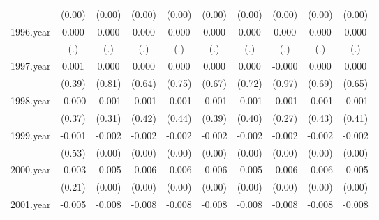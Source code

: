 {\begin{tabular}{l*{9}{c}}
          &   (0.00)         &   (0.00)         &   (0.00)         &   (0.00)         &   (0.00)         &   (0.00)         &   (0.00)         &   (0.00)         &   (0.00)         \\
[1em]
1996.year &    0.000         &    0.000         &    0.000         &    0.000         &    0.000         &    0.000         &    0.000         &    0.000         &    0.000         \\
          &      (.)         &      (.)         &      (.)         &      (.)         &      (.)         &      (.)         &      (.)         &      (.)         &      (.)         \\
[1em]
1997.year &    0.001         &    0.000         &    0.000         &    0.000         &    0.000         &    0.000         &   -0.000         &    0.000         &    0.000         \\
          &   (0.39)         &   (0.81)         &   (0.64)         &   (0.75)         &   (0.67)         &   (0.72)         &   (0.97)         &   (0.69)         &   (0.65)         \\
[1em]
1998.year &   -0.000         &   -0.001         &   -0.001         &   -0.001         &   -0.001         &   -0.001         &   -0.001         &   -0.001         &   -0.001         \\
          &   (0.37)         &   (0.31)         &   (0.42)         &   (0.44)         &   (0.39)         &   (0.40)         &   (0.27)         &   (0.43)         &   (0.41)         \\
[1em]
1999.year &   -0.001         &   -0.002\sym{***}&   -0.002\sym{***}&   -0.002\sym{***}&   -0.002\sym{***}&   -0.002\sym{***}&   -0.002\sym{***}&   -0.002\sym{***}&   -0.002\sym{**} \\
          &   (0.53)         &   (0.00)         &   (0.00)         &   (0.00)         &   (0.00)         &   (0.00)         &   (0.00)         &   (0.00)         &   (0.00)         \\
[1em]
2000.year &   -0.003         &   -0.005\sym{***}&   -0.006\sym{***}&   -0.006\sym{***}&   -0.006\sym{***}&   -0.005\sym{***}&   -0.006\sym{***}&   -0.006\sym{***}&   -0.005\sym{***}\\
          &   (0.21)         &   (0.00)         &   (0.00)         &   (0.00)         &   (0.00)         &   (0.00)         &   (0.00)         &   (0.00)         &   (0.00)         \\
[1em]
2001.year &   -0.005         &   -0.008\sym{***}&   -0.008\sym{***}&   -0.008\sym{***}&   -0.008\sym{***}&   -0.008\sym{***}&   -0.008\sym{***}&   -0.008\sym{***}&   -0.008\sym{***}\\

\end{tabular}}
